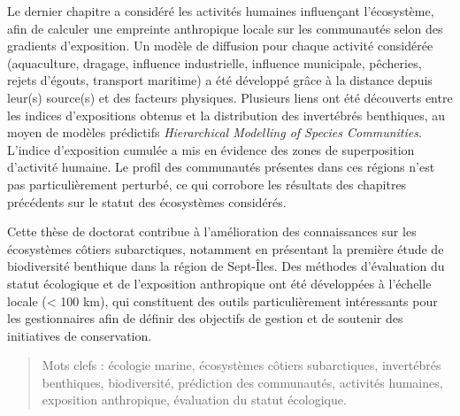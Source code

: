 Le dernier chapitre a considéré les activités humaines influençant
l'écosystème, afin de calculer une empreinte anthropique locale sur les
communautés selon des gradients d'exposition. Un modèle de diffusion
pour chaque activité considérée (aquaculture, dragage, influence
industrielle, influence municipale, pêcheries, rejets d'égouts,
transport maritime) a été développé grâce à la distance depuis leur(s)
source(s) et des facteurs physiques. Plusieurs liens ont été découverts
entre les indices d'expositions obtenus et la distribution des
invertébrés benthiques, au moyen de modèles prédictifs
\textit{Hierarchical Modelling of Species Communities}. L'indice
d'exposition cumulée a mis en évidence des zones de superposition
d'activité humaine. Le profil des communautés présentes dans ces régions
n'est pas particulièrement perturbé, ce qui corrobore les résultats des
chapitres précédents sur le statut des écosystèmes considérés.

Cette thèse de doctorat contribue à l'amélioration des connaissances sur
les écosystèmes côtiers subarctiques, notamment en présentant la
première étude de biodiversité benthique dans la région de Sept-Îles.
Des méthodes d'évaluation du statut écologique et de l'exposition
anthropique ont été développées à l'échelle locale (\textless{} 100 km),
qui constituent des outils particulièrement intéressants pour les
gestionnaires afin de définir des objectifs de gestion et de soutenir
des initiatives de conservation.

\begin{quote}
Mots clefs : écologie marine, écosystèmes côtiers subarctiques,
invertébrés benthiques, biodiversité, prédiction des communautés,
activités humaines, exposition anthropique, évaluation du statut
écologique.
\end{quote}
